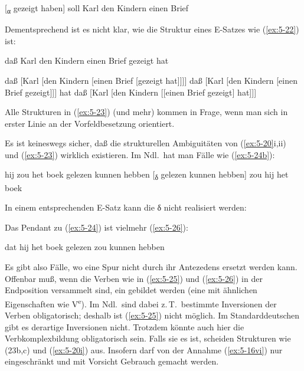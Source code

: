 \documentclass[output=paper]{LSP/langsci}
\begin{document}
\begin{exe}
\ex%
\label{ex:5-21}
[\textsubscript{α} gezeigt haben] soll Karl den Kindern einen Brief
\end{exe}
Dementsprechend ist es nicht klar, wie die Struktur eines E-Satzes wie (\ref{ex:5-22}) ist:
\begin{exe}
\ex%
\label{ex:5-22}
daß Karl den Kindern einen Brief gezeigt hat
\ex%
\label{ex:5-23}
\begin{xlist}
\ex%
\label{ex:5-23a}
daß [Karl [den Kindern [einen Brief [gezeigt hat]]]]
\ex%
\label{ex:5-23b}
 daß [Karl [den Kindern [einen Brief gezeigt]]] hat
\ex%
\label{ex:5-23c}
daß [Karl [den Kindern [[einen Brief gezeigt] hat]]]
\end{xlist}
\end{exe}
Alle Strukturen in (\ref{ex:5-23}) (und mehr) kommen in Frage, wenn man sich in
erster Linie an der Vorfeldbesetzung orientiert.

Es ist keineswegs sicher, daß die strukturellen Ambiguitäten von
(\ref{ex:5-20}i,ii) und (\ref{ex:5-23}) wirklich existieren. Im Ndl.\ hat man Fälle wie
(\ref{ex:5-24b}):
\begin{exe}
\ex%
\label{ex:5-24}
\begin{xlist}
\ex%
\label{ex:5-24a}
hij zou het boek gelezen kunnen hebben
\ex%
\label{ex:5-24b}
 [\textsubscript{δ} gelezen kunnen hebben] zou hij het boek
\end{xlist}
\end{exe}
In einem entsprechenden E-Satz kann die  δ nicht
realisiert werden:
\begin{exe}
\ex%
\label{ex:5-25}
\begin{xlist}
\end{xlist}
\end{exe}
Das Pendant zu (\ref{ex:5-24}) ist vielmehr (\ref{ex:5-26}):
\begin{exe}
\ex%
\label{ex:5-26}
dat hij het boek gelezen zou kunnen hebben
\end{exe}
Es gibt also Fälle, wo eine Spur nicht durch ihr Antezedens ersetzt
werden kann. Offenbar muß, wenn die Verben wie in (\ref{ex:5-25}) und
(\ref{ex:5-26}) in der Endposition versammelt sind, ein
 gebildet werden (eine  mit ähnlichen
Eigenschaften wie V\textsuperscript{e}). Im Ndl.\ sind dabei
z.\,T.\ bestimmte Inversionen der Verben obligatorisch; deshalb ist
(\ref{ex:5-25}) nicht möglich. Im Standarddeutschen gibt es derartige
Inversionen nicht. Trotzdem könnte auch hier die Verbkomplexbildung
obligatorisch sein. Falls sie es ist, scheiden Strukturen wie (23b,c)
und (\ref{ex:5-20i}) aus. Insofern darf von der Annahme
(\ref{ex:5-16vi}) nur eingeschränkt und mit Vorsicht Gebrauch gemacht
werden.
\end{document}

